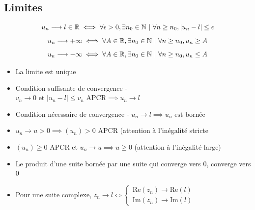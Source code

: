 \documentclass[openany]{book}
\begin{document}
\subsection{Limites}
\[ u_n \longrightarrow l \in \mathbb{R} \iff \forall \epsilon > 0, \exists n_0 \in \mathbb{N} \text{ } | \text{ } \forall n \geq n_0, |u_n - l| \leq \epsilon \]
\[ u_n \longrightarrow +\infty \iff \forall A \in \mathbb{R}, \exists n_0 \in \mathbb{N} \text{ } | \text{ } \forall n \geq n_0, u_n \geq A \]
\[ u_n \longrightarrow -\infty \iff \forall A \in \mathbb{R}, \exists n_0 \in \mathbb{N} \text{ } | \text{ } \forall n \geq n_0, u_n \leq A \]

\begin{itemize}
    \item La limite est unique 
    \item Condition suffisante de convergence - $ v_n \longrightarrow 0 \text{ et } |u_n - l| \leq v_n \text{ APCR} \implies u_n \longrightarrow l $
    \item Condition nécessaire de convergence - $ u_n \longrightarrow l \implies u_n \text{ est bornée} $ 
    \item $ u_n \longrightarrow u > 0 \implies (u_n) > 0 $ APCR (attention à l'inégalité stricte
    \item $ (u_n) \geq 0 \text{ APCR et } u_n \longrightarrow u \implies u \geq 0 $ (attention à l'inégalité large) 
    \item Le produit d'une suite bornée par une suite qui converge vers 0, converge vers 0
    \item Pour une suite complexe, $ z_n \longrightarrow l \iff \begin{cases}
        \text{Re}(z_n) \longrightarrow \text{Re}(l) \\
        \text{Im}(z_n) \longrightarrow \text{Im}(l)
    \end{cases} $
\end{itemize}
\end{document}

